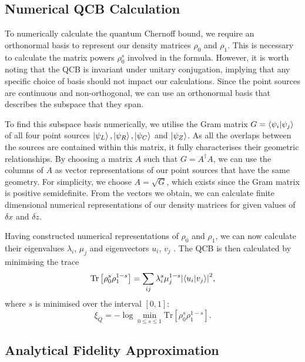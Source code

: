 \documentclass[reprint,amsmath,amssymb,aps,prl,floatfix,groupedaddress,superscriptaddress]{revtex4-2}
\begin{document}
\subsection{Numerical QCB Calculation} \label{app:QCB_calculation_numerical}

To numerically calculate the quantum Chernoff bound, we require an orthonormal basis to represent our density matrices $\rho_0$ and $\rho_1$. This is necessary to calculate the matrix powers $\rho_0^s$ involved in the formula. However, it is worth noting that the QCB is invariant under unitary conjugation, implying that any specific choice of basis should not impact our calculations. Since the point sources are continuous and non-orthogonal, we can use an orthonormal basis that describes the subspace that they span.

To find this subspace basis numerically, we utilise the Gram matrix $G = \braket{\psi_i}{\psi_j}$ of all four point sources $\ket{\psi_L}, \ket{\psi_R}, \ket{\psi_C}$ and $\ket{\psi_Z}$. As all the overlaps between the sources are contained within this matrix, it fully characterises their geometric relationships. By choosing a matrix $A$ such that $G=A^\dagger A$, we can use the columns of $A$ as vector representations of our point sources that have the same geometry. For simplicity, we choose $A = \sqrt{G}$, which exists since the Gram matrix is positive semidefinite. From the vectors we obtain, we can calculate finite dimensional numerical representations of our density matrices for given values of $\delta x$ and $\delta z$.

Having constructed numerical representations of $\rho_0$ and $\rho_1$, we can now calculate their eigenvalues $\lambda_i$, $\mu_j$ and eigenvectors $u_i$, $v_j$ \cite{audenaert2007discriminating}. The QCB is then calculated by minimising the trace
\begin{equation}
    \text{Tr}\left[\rho_0^s \rho_1^{1-s} \right] = \sum_{ij} \lambda_i^s \mu_j^{1-s} \abs{\braket{u_i}{v_j}}^2,
\end{equation}
where $s$ is minimised over the interval $[0,1]$:
\begin{equation}
\xi_Q = -\log \min_{0 \leq s \leq 1} \text{Tr} \left[ \rho_0^s \rho_1^{1-s} \right].
\end{equation}

\subsection{Analytical Fidelity Approximation} \label{app:fidelity_approximation}
\end{document}
